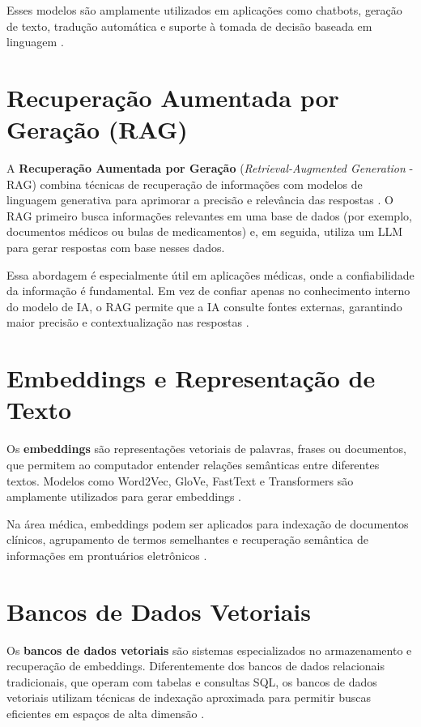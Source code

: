 Esses modelos são amplamente utilizados em aplicações como chatbots, geração de texto, tradução automática e suporte à tomada de decisão baseada em linguagem \cite{bommasani2021opportunities}.

\section{Recuperação Aumentada por Geração (RAG)}

A \textbf{Recuperação Aumentada por Geração} (\textit{Retrieval-Augmented Generation} - RAG) combina técnicas de recuperação de informações com modelos de linguagem generativa para aprimorar a precisão e relevância das respostas \cite{lewis2020retrieval}. O RAG primeiro busca informações relevantes em uma base de dados (por exemplo, documentos médicos ou bulas de medicamentos) e, em seguida, utiliza um LLM para gerar respostas com base nesses dados.

Essa abordagem é especialmente útil em aplicações médicas, onde a confiabilidade da informação é fundamental. Em vez de confiar apenas no conhecimento interno do modelo de IA, o RAG permite que a IA consulte fontes externas, garantindo maior precisão e contextualização nas respostas \cite{mialon2023augmented}.

\section{Embeddings e Representação de Texto}

Os \textbf{embeddings} são representações vetoriais de palavras, frases ou documentos, que permitem ao computador entender relações semânticas entre diferentes textos. Modelos como Word2Vec, GloVe, FastText e Transformers são amplamente utilizados para gerar embeddings \cite{mikolov2013distributed}.

Na área médica, embeddings podem ser aplicados para indexação de documentos clínicos, agrupamento de termos semelhantes e recuperação semântica de informações em prontuários eletrônicos \cite{pennington2014glove}.

\section{Bancos de Dados Vetoriais}

Os \textbf{bancos de dados vetoriais} são sistemas especializados no armazenamento e recuperação de embeddings. Diferentemente dos bancos de dados relacionais tradicionais, que operam com tabelas e consultas SQL, os bancos de dados vetoriais utilizam técnicas de indexação aproximada para permitir buscas eficientes em espaços de alta dimensão \cite{johnson2019billion}.

